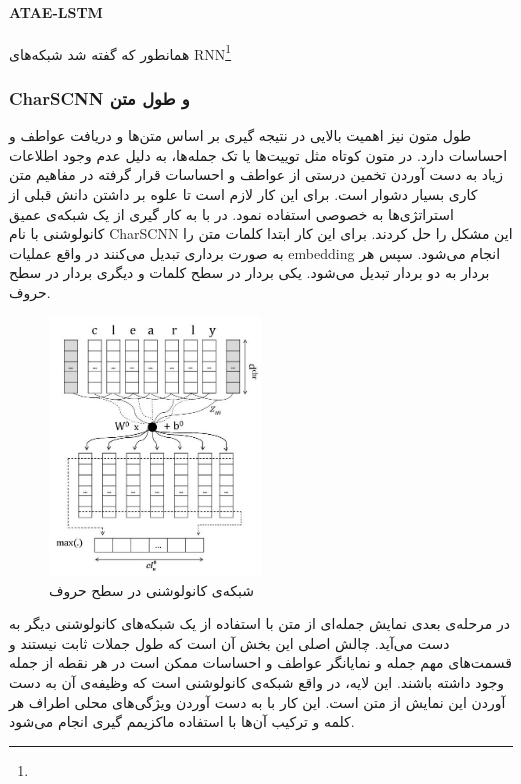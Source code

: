 \documentclass[12pt, a4paper, oneside]{report}
\begin{document}
\paragraph{ATAE-LSTM} \hfill \break

همانطور که گفته شد شبکه‌های
RNN\footnote{}


\subsubsection{CharSCNN و طول متن}

طول متون نیز اهمیت بالایی در نتیجه گیری بر اساس متن‌ها و دریافت عواطف و احساسات دارد.
در متون کوتاه مثل توییت‌ها یا تک جمله‌ها، به دلیل عدم وجود اطلاعات زیاد به دست آوردن تخمین درستی از
عواطف و احساسات قرار گرفته در مفاهیم متن کاری بسیار دشوار است.
برای این کار لازم است تا علوه بر داشتن دانش قبلی از استراتژی‌ها به خصوصی استفاده نمود.
در
\cite{dos2014deep}
با به کار گیری از یک شبکه‌ی عمیق کانولوشنی با نام
CharSCNN
این مشکل را حل کردند. برای این کار ابتدا کلمات متن را به صورت برداری تبدیل می‌کنند در واقع عملیات
embedding
انجام می‌شود. سپس هر بردار به دو بردار تبدیل می‌شود. یکی بردار در سطح کلمات و دیگری بردار در سطح حروف.

\begin{figure}[h]
    \centering
    \includegraphics[width=0.5\textwidth]{CHARCNN}
    \caption{ شبکه‌ی کانولوشنی در سطح حروف }
    \label{fig:CHARCNN}
\end{figure}

در مرحله‌ی بعدی نمایش جمله‌ای از متن با استفاده از یک شبکه‌های کانولوشنی دیگر به دست می‌آید.
چالش اصلی این بخش آن است که طول جملات ثابت نیستند و قسمت‌های مهم جمله و نمایانگر عواطف و احساسات
ممکن است در هر نقطه از جمله وجود داشته باشند. این لایه، در واقع شبکه‌ی کانولوشنی است که وظیفه‌ی آن
به دست آوردن این نمایش از متن است. این کار با به دست آوردن ویژگی‌های محلی اطراف هر کلمه و ترکیب
آن‌ها با استفاده ماکزیمم گیری انجام می‌شود.
\end{document}
